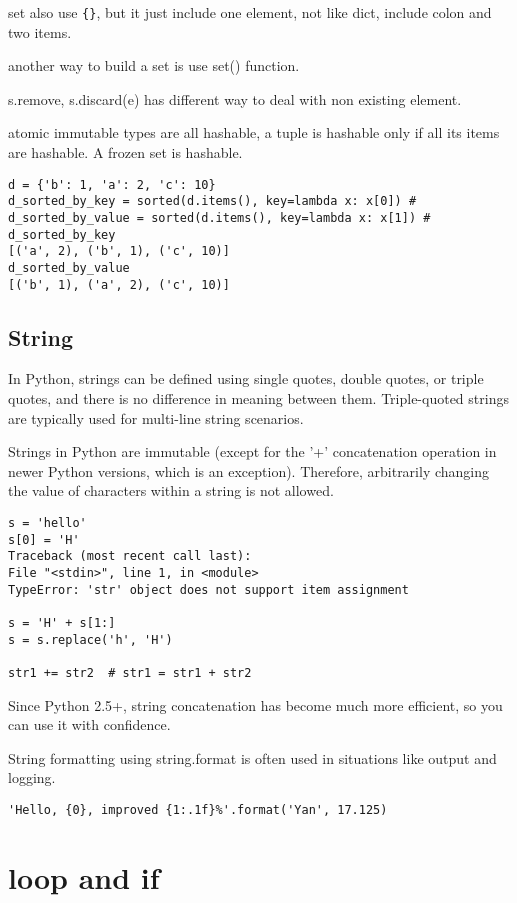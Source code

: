 \documentclass[a4paper,12pt,twoside]{book}
\begin{document}
	set also use \verb|{}|, but it just include one element, not like dict, include colon and two items. 
	
	
	another way to build a set is use set() function. 
	
	s.remove, s.discard(e) has different way to deal with non existing element. 


atomic immutable types are all hashable, a tuple is hashable only if all its items are hashable. A frozen set is hashable. 

\begin{lstlisting}
d = {'b': 1, 'a': 2, 'c': 10}
d_sorted_by_key = sorted(d.items(), key=lambda x: x[0]) # 
d_sorted_by_value = sorted(d.items(), key=lambda x: x[1]) # 
d_sorted_by_key
[('a', 2), ('b', 1), ('c', 10)]
d_sorted_by_value
[('b', 1), ('a', 2), ('c', 10)]
\end{lstlisting}

\subsection{String}
In Python, strings can be defined using single quotes, double quotes, or triple quotes, and there is no difference in meaning between them. Triple-quoted strings are typically used for multi-line string scenarios. 

Strings in Python are immutable (except for the '+' concatenation operation in newer Python versions, which is an exception). Therefore, arbitrarily changing the value of characters within a string is not allowed. 
\begin{lstlisting}
s = 'hello'
s[0] = 'H'
Traceback (most recent call last):
File "<stdin>", line 1, in <module>
TypeError: 'str' object does not support item assignment

s = 'H' + s[1:]
s = s.replace('h', 'H')

str1 += str2  # str1 = str1 + str2
\end{lstlisting}

Since Python 2.5+, string concatenation has become much more efficient, so you can use it with confidence. 

String formatting using string.format is often used in situations like output and logging.


\begin{lstlisting}
'Hello, {0}, improved {1:.1f}%'.format('Yan', 17.125)
\end{lstlisting}

\section{loop and if}
\end{document}
